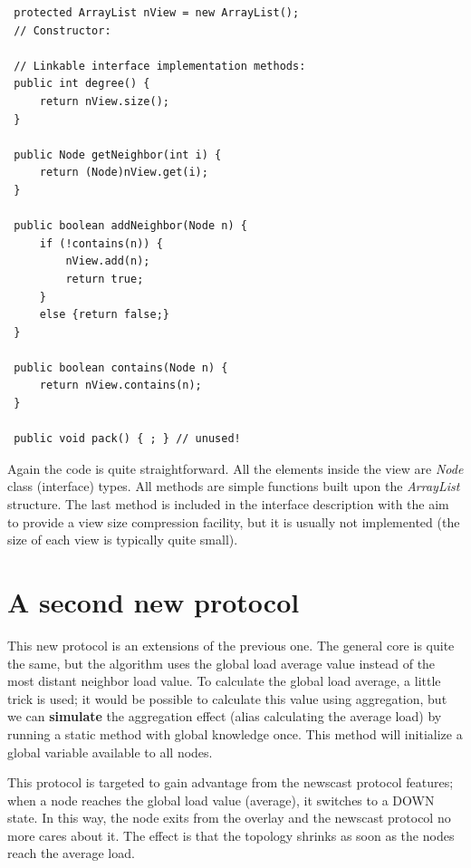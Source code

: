 \documentclass[a4paper,11pt]{article}
\begin{document}
\footnotesize
\begin{verbatim}
 protected ArrayList nView = new ArrayList();
 // Constructor:
 
 // Linkable interface implementation methods:
 public int degree() {
     return nView.size();
 }
 
 public Node getNeighbor(int i) {
     return (Node)nView.get(i);
 } 
 
 public boolean addNeighbor(Node n) {
     if (!contains(n)) {
         nView.add(n);
         return true;
     }
     else {return false;}
 }
 
 public boolean contains(Node n) {
     return nView.contains(n);
 }
 
 public void pack() { ; } // unused!
\end{verbatim}
\normalsize

Again the code is quite straightforward. All the elements inside the
view are \emph{Node} class (interface) types. All methods are simple
functions built upon the \emph{ArrayList} structure. The last method
is included in the interface description with the aim to provide a
view size compression facility, but it is usually not implemented (the
size of each view is typically quite small).


\section{A second new protocol}

This new protocol is an extensions of the previous one. The general
core is quite the same, but the algorithm uses the global load average
value instead of the most distant neighbor load value. To calculate
the global load average, a little trick is used; it would be possible
to calculate this value using aggregation, but we can \textbf{simulate}
the aggregation effect (alias calculating the average load) by running
a static method with global knowledge once. This method will initialize
a global variable available to all nodes. 

This protocol is targeted to gain advantage from the newscast protocol
features; when a node reaches the global load value (average), it
switches to a DOWN state. In this way, the node exits from the overlay
and the newscast protocol no more cares about it. The effect is that
the topology shrinks as soon as the nodes reach the average load.
\end{document}
